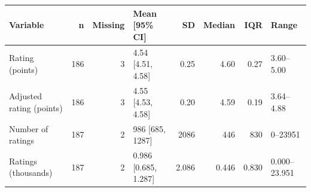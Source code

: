\begin{tabular}{lrrlrrrl}
\toprule
Variable & n & Missing & Mean [95\% CI] & SD & Median & IQR & Range \\
\midrule
Rating (points) & 186 & 3 & 4.54 [4.51, 4.58] & 0.25 & 4.60 & 0.27 & 3.60--5.00 \\
Adjusted rating (points) & 186 & 3 & 4.55 [4.53, 4.58] & 0.20 & 4.59 & 0.19 & 3.64--4.88 \\
Number of ratings & 187 & 2 & 986 [685, 1287] & 2086 & 446 & 830 & 0--23951 \\
Ratings (thousands) & 187 & 2 & 0.986 [0.685, 1.287] & 2.086 & 0.446 & 0.830 & 0.000--23.951 \\
\bottomrule
\end{tabular}
